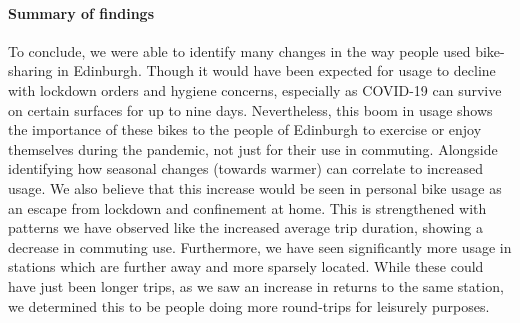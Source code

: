 \documentclass[11pt,a4paper]{article}
\begin{document}
\paragraph{Summary of findings}
To conclude, we were able to identify many changes in the way people used bike-sharing in Edinburgh. Though it would have been expected for usage to decline with lockdown orders and hygiene concerns, especially as COVID-19 can survive on certain surfaces for up to nine days. Nevertheless, this boom in usage shows the importance of these bikes to the people of Edinburgh to exercise or enjoy themselves during the pandemic, not just for their use in commuting. Alongside identifying how seasonal changes (towards warmer) can correlate to increased usage. We also believe that this increase would be seen in personal bike usage as an escape from lockdown and confinement at home. This is strengthened with patterns we have observed like the increased average trip duration, showing a decrease in commuting use. Furthermore, we have seen significantly more usage in stations which are further away and more sparsely located. While these could have just been longer trips, as we saw an increase in returns to the same station, we determined this to be people doing more round-trips for leisurely purposes.

\newpage



\end{document}
